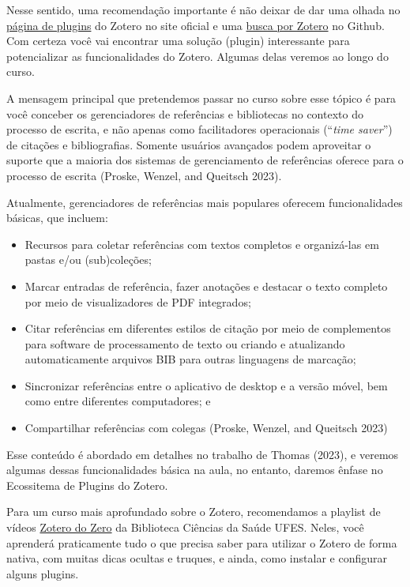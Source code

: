 \documentclass[
  a4paper,
]{article}
\begin{document}
Nesse sentido, uma recomendação importante é não deixar de dar uma
olhada no \href{https://www.zotero.org/support/plugins}{página de
plugins} do Zotero no site oficial e uma
\href{https://github.com/search?q=zotero&type=repositories}{busca por
Zotero} no Github. Com certeza você vai encontrar uma solução (plugin)
interessante para potencializar as funcionalidades do Zotero. Algumas
delas veremos ao longo do curso.

A mensagem principal que pretendemos passar no curso sobre esse tópico é
para você conceber os gerenciadores de referências e bibliotecas no
contexto do processo de escrita, e não apenas como facilitadores
operacionais (``\emph{time saver}'') de citações e bibliografias.
Somente usuários avançados podem aproveitar o suporte que a maioria dos
sistemas de gerenciamento de referências oferece para o processo de
escrita (Proske, Wenzel, and Queitsch 2023).

Atualmente, gerenciadores de referências mais populares oferecem
funcionalidades básicas, que incluem:

\begin{itemize}
\item
  Recursos para coletar referências com textos completos e organizá-las
  em pastas e/ou (sub)coleções;
\item
  Marcar entradas de referência, fazer anotações e destacar o texto
  completo por meio de visualizadores de PDF integrados;
\item
  Citar referências em diferentes estilos de citação por meio de
  complementos para software de processamento de texto ou criando e
  atualizando automaticamente arquivos BIB para outras linguagens de
  marcação;
\item
  Sincronizar referências entre o aplicativo de desktop e a versão
  móvel, bem como entre diferentes computadores; e
\item
  Compartilhar referências com colegas (Proske, Wenzel, and Queitsch
  2023)
\end{itemize}

Esse conteúdo é abordado em detalhes no trabalho de Thomas (2023), e
veremos algumas dessas funcionalidades básica na aula, no entanto,
daremos ênfase no Ecossitema de Plugins do Zotero.

Para um curso mais aprofundado sobre o Zotero, recomendamos a playlist
de vídeos
\href{https://youtube.com/playlist?list=PLEbpo1iiweYXhQs1-yKJhTLPio1PlBD0i&si=bI3_sDEQe58XOCTf}{Zotero
do Zero} da Biblioteca Ciências da Saúde UFES. Neles, você aprenderá
praticamente tudo o que precisa saber para utilizar o Zotero de forma
nativa, com muitas dicas ocultas e truques, e ainda, como instalar e
configurar alguns plugins.
\end{document}
